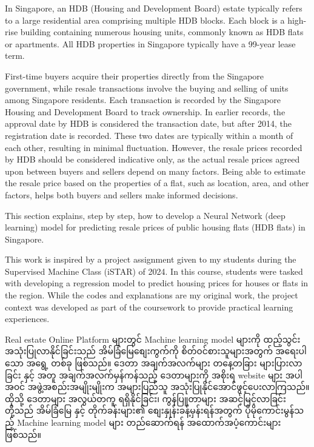 In Singapore, an HDB (Housing and Development Board) estate typically refers to a large residential area comprising multiple HDB blocks. Each block is a high-rise building containing numerous housing units, commonly known as HDB flats or apartments.  All HDB properties in Singapore typically have a 99-year lease term.

First-time buyers acquire their properties directly from the Singapore government, while resale transactions involve the buying and selling of units among Singapore residents. Each transaction is recorded by the Singapore Housing and Development Board to track ownership. In earlier records, the approval date by HDB is considered the transaction date, but after 2014, the registration date is recorded. These two dates are typically within a month of each other, resulting in minimal fluctuation. However, the resale prices recorded by HDB should be considered indicative only, as the actual resale prices agreed upon between buyers and sellers depend on many factors. Being able to estimate the resale price based on the properties of a flat, such as location, area, and other factors, helps both buyers and sellers make informed decisions.

This section explains, step by step, how to develop a Neural Network (deep learning) model for predicting resale prices of public housing flats (HDB flats) in Singapore. 

\begin{remark}
This work is inspired by a project assignment given to my students during the Supervised Machine Class (iSTAR) of 2024. In this course, students were tasked with developing a regression model to predict housing prices for houses or flats in the region. While the codes and explanations are my original work, the project context was developed as part of the coursework to provide practical learning experiences.
\end{remark}

Real estate Online Platform များတွင်  Machine learning model များကို ထည့်သွင်း အသုံးပြုလာနိုင်ခြင်းသည် အိမ်ခြံမြေစျေးကွက်ကို စိတ်၀င်စားသူများအတွက် အရေးပါသော အရွေ့ တစ်ခု ဖြစ်သည်။ ဒေတာ အချက်အလက်များ တနေ့တခြား များပြားလာခြင်း နှင့် အတူ အချက်အလက်မှန်ကန်သည့် ဒေတာများကို အစိုးရ website များ အပါအ၀င် အဖွဲ့အစည်းအမျိုးမျိုးက အများပြည်သူ အသုံးပြုနိုင်အောင်ဖွင့်ပေးလာကြသည်။ ထိုသို့ ဒေတာများ အလွယ်တကူ ရရှိနိုင်ခြင်း၊ ကွန်ပြူတာများ အဆင့်မြင့်လာခြင်းတို့သည် အိမ်ခြံမြေ နှင့် တိုက်ခန်းများ၏ စျေးနှုန်းခန့်မှန်းရန်အတွက် ပိုမိုကောင်းမွန်သည့် Machine learning model များ တည်ဆောက်ရန် အထောက်အပံ့ကောင်းများ ဖြစ်သည်။ 

